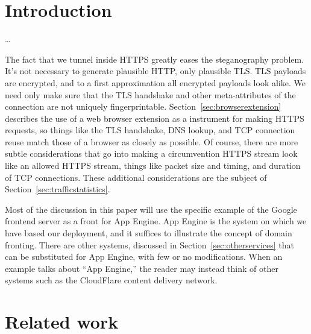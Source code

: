 \documentclass{article}
\begin{document}
\section{Introduction}


\ldots

The fact that we tunnel inside HTTPS greatly eases the steganography problem.
It's not necessary to generate plausible HTTP, only plausible TLS.
TLS payloads are encrypted, and to a first approximation all encrypted payloads look alike.
We need only make sure that the TLS handshake and other meta-attributes of the connection are not uniquely fingerprintable.
Section~\ref{sec:browserextension} describes the use of a web browser extension as a instrument for making HTTPS requests,
so things like the TLS handshake, DNS lookup, and TCP connection reuse match those of a browser as closely as possible.
Of course, there are more subtle considerations that go into
making a circumvention HTTPS stream look like an allowed HTTPS stream,
things like packet size and timing, and duration of TCP connections.
These additional considerations are the subject of Section~\ref{sec:trafficstatistics}.

Most of the discussion in this paper will use the specific example of the
Google frontend server as a front for App Engine.
App Engine is the system on which we have based our deployment,
and it suffices to illustrate the concept of domain fronting.
There are other systems, discussed in Section~\ref{sec:otherservices}
that can be substituted for App Engine, with few or no modifications.
When an example talks about ``App Engine,'' the reader may instead think
of other systems such as the CloudFlare content delivery network.

\section{Related work}


%
\end{document}
